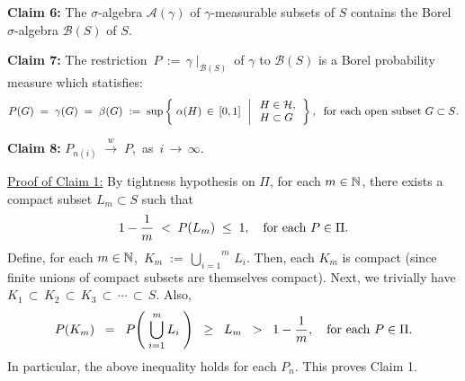 \vskip 0.5cm
\begin{center}
\begin{minipage}{6.5in}
\textbf{Claim 6:}\quad
The $\sigma$-algebra $\mathcal{A}(\gamma)$ of $\gamma$-measurable subsets of $S$ contains
the Borel $\sigma$-algebra $\mathcal{B}(S)$ of $S$.
\end{minipage}
\end{center}

\vskip 0.5cm
\begin{center}
\begin{minipage}{6.5in}
\textbf{Claim 7:}\quad
The restriction \,$P \, := \, \gamma\;\vert_{\mathcal{B}(S)}$\, of $\gamma$ to $\mathcal{B}(S)$
is a Borel probability measure which statisfies:
\begin{equation*}
P(G)
\; = \; \gamma(G)
\; = \; \beta(G)
\; := \;
\sup\left\{\;
\alpha(H) \,\in\, [0,1]
\,\;\left\vert\;
\begin{array}{l} H \in \mathcal{H}, \\ H \subset G \end{array}
\right.
\right\},
\;\;
\textnormal{for each open subset $G \subset S$}.
\end{equation*}
\end{minipage}
\end{center}

\vskip 0.5cm
\begin{center}
\begin{minipage}{6.5in}
\textbf{Claim 8:}\quad
$P_{n(i)} \;\overset{w}{\longrightarrow}\; P$,\,
as \,$i\,\longrightarrow\,\infty$.
\end{minipage}
\end{center}

\vskip 0.5cm
\noindent
\underline{Proof of Claim 1:}\quad
By tightness hypothesis on $\Pi$,
for each $m \in \mathbb{N}$,
there exists a compact subset $L_{m} \subset S$ such that
\begin{equation*}
1 - \dfrac{1}{m} \; < \; P(L_{m}) \; \leq \; 1,
\quad
\textnormal{for each $P \in \Pi$}.
\end{equation*}
Define, for each $m \in \mathbb{N}$,
\,$K_{m} \; := \, \overset{m}{\underset{i=1}{\bigcup}}\,L_{i}$.
Then, each $K_{m}$ is compact (since finite unions of compact subsets are themselves compact).
Next, we trivially have\;
$K_{1} \,\subset\, K_{2} \,\subset\, K_{3} \,\subset\, \cdots \,\subset\, S$.
Also,
\begin{equation*}
P(K_{m})
\;\;=\;\; P\!\left(\;\bigcup_{i=1}^{m}L_{i}\;\right)
\;\;\geq\;\; L_{m}
\;\; > \;\; 1 - \dfrac{1}{m},
\quad
\textnormal{for each $P \in \Pi$}.
\end{equation*}
In particular, the above inequality holds for each $P_{n}$. This proves Claim 1.


